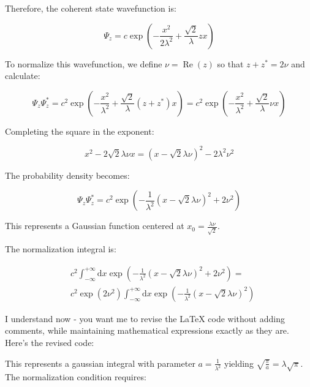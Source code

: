 \documentclass[italian]{HKNdocument}
\begin{document}
Therefore, the coherent state wavefunction is:

\begin{equation}
\Psi_{z}=c \exp \left(-\frac{x^{2}}{2 \lambda^{2}}+\frac{\sqrt{2}}{\lambda} z x\right) \label{eq:7.53}
\end{equation}

To normalize this wavefunction, we define $\nu=\operatorname{Re}(z)$ so that $z+z^{*}=2 \nu$ and calculate:

\begin{equation}
\Psi_{z} \Psi_{z}^{*}=c^{2} \exp \left(-\frac{x^{2}}{\lambda^{2}}+\frac{\sqrt{2}}{\lambda}\left(z+z^{*}\right) x\right)=c^{2} \exp \left(-\frac{x^{2}}{\lambda^{2}}+\frac{\sqrt{2}}{\lambda} \nu x\right) \label{eq:7.54}
\end{equation}

Completing the square in the exponent:

\begin{equation}
x^{2}-2 \sqrt{2} \lambda \nu x=(x-\sqrt{2} \lambda \nu)^{2}-2 \lambda^{2} \nu^{2} \label{eq:7.55}
\end{equation}

The probability density becomes:

\begin{equation}
\Psi_{z} \Psi_{z}^{*}=c^{2} \exp \left(-\frac{1}{\lambda^{2}}(x-\sqrt{2} \lambda \nu)^{2}+2 \nu^{2}\right) \label{eq:7.56}
\end{equation}

This represents a Gaussian function centered at $x_{0}=\frac{\lambda \nu}{\sqrt{2}}$.

The normalization integral is:

\begin{align}
& c^{2} \int_{-\infty}^{+\infty} \mathrm{d} x \exp \left(-\frac{1}{\lambda^{2}}(x-\sqrt{2} \lambda \nu)^{2}+2 \nu^{2}\right)= \\
& c^{2} \exp \left(2 \nu^{2}\right) \int_{-\infty}^{+\infty} \mathrm{d} x \exp \left(-\frac{1}{\lambda^{2}}(x-\sqrt{2} \lambda \nu)^{2}\right) \label{eq:7.57}
\end{align}

I understand now - you want me to revise the LaTeX code without adding comments, while maintaining mathematical expressions exactly as they are. Here's the revised code:


This represents a gaussian integral with parameter $a=\frac{1}{\lambda^{2}}$ yielding $\sqrt{\frac{\pi}{a}}=\lambda \sqrt{\pi}$. The normalization condition requires:
\end{document}
